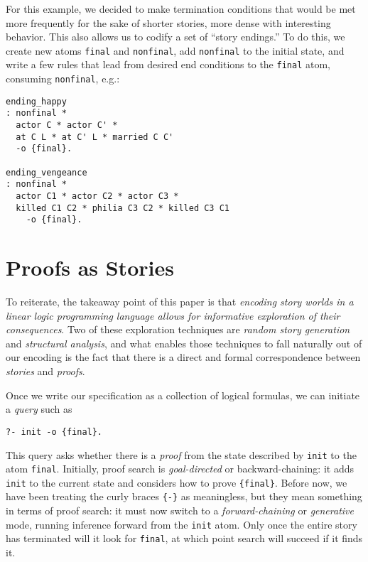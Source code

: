 \documentclass[letterpaper]{article}
\begin{document}
For this example, we decided to make termination conditions that would be
met more frequently for the sake of shorter stories, more dense with
interesting behavior. This also allows us to codify a set of ``story
endings.'' To do this, we create new atoms \verb|final| and
\verb|nonfinal|, add \verb|nonfinal| to the initial state,
and write a few rules that lead from desired end conditions to
the \verb|final| atom, consuming \verb|nonfinal|, e.g.:

\begin{verbatim}
ending_happy
: nonfinal *
  actor C * actor C' *
  at C L * at C' L * married C C'
  -o {final}.

ending_vengeance
: nonfinal *
  actor C1 * actor C2 * actor C3 *
  killed C1 C2 * philia C3 C2 * killed C3 C1
    -o {final}.
\end{verbatim}

\section{Proofs as Stories}

To reiterate, the takeaway point of this paper is that {\em encoding
story worlds in a linear logic programming language allows for informative
exploration of their consequences}.  Two of these exploration techniques
are {\em random story generation} and {\em structural analysis}, and what
enables those techniques to fall naturally out of our encoding is the fact
that there is a direct and formal correspondence between {\em stories} and
{\em proofs}. 

Once we write our specification as a collection of logical
formulas, we can initiate a {\em query} such as

\begin{verbatim}
?- init -o {final}.
\end{verbatim}

This query asks whether there is a {\em proof} from the state described by
\verb|init| to the atom \verb|final|. Initially, proof search is {\em
goal-directed} or backward-chaining: it adds \verb|init| to the current
state and considers how to prove \verb|{final}|. Before now, we have been
treating the curly braces \verb|{-}| as meaningless, but they mean
something in terms of proof search: it must now switch to a {\em
forward-chaining} or {\em generative} mode, running inference forward from
the \verb|init| atom. Only once the entire story has terminated will it
look for \verb|final|, at which point search will succeed if it finds it.
\end{document}
